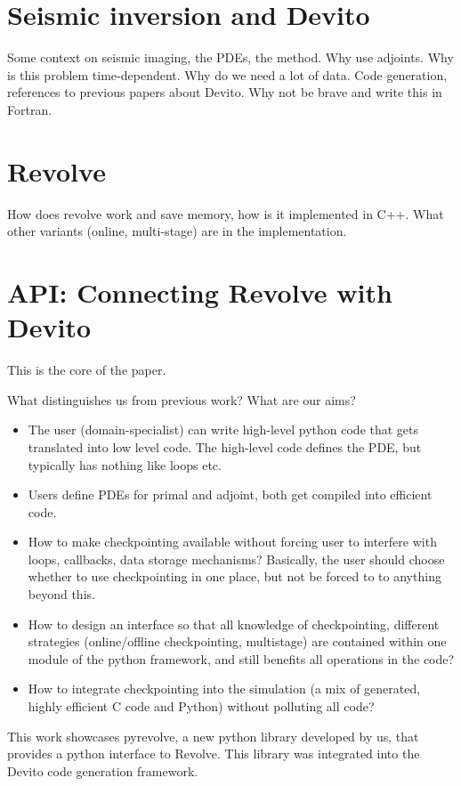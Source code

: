 \documentclass[sigconf]{acmart}
\begin{document}
\section{Seismic inversion and Devito}
\label{sec:inversion_devito}
Some context on seismic imaging, the PDEs, the method. Why use
adjoints. Why is this problem time-dependent. Why do we need a lot of
data.
Code generation, references to previous papers about Devito. Why not
be brave and write this in Fortran.

\section{Revolve}
\label{sec:revolve}
How does revolve work and save memory, how is it implemented in C++. What other variants (online,
multi-stage) are in the implementation.

\section{API: Connecting Revolve with Devito}
\label{sec:api}
This is the core of the paper.

What distinguishes us from previous work? What are our aims?
\begin{itemize}
\item The user (domain-specialist) can write high-level python code that gets translated into low
level code. The high-level code defines the PDE, but typically has nothing like loops etc.
\item Users define PDEs for primal and adjoint, both get compiled into efficient code.
\item How to make checkpointing available without forcing user to interfere with loops, callbacks,
data storage mechanisms? Basically, the user should choose whether to use checkpointing in one
place, but not be forced to to anything beyond this.
\item How to design an interface so that all knowledge of checkpointing, different strategies
(online/offline checkpointing, multistage) are contained within one module of the python framework,
and still benefits all operations in the code?
\item How to integrate checkpointing into the simulation (a mix of generated, highly efficient C
code and Python) without polluting all code?
\end{itemize}

This work showcases pyrevolve, a new python library developed by us, that provides a python
interface to Revolve. This library was integrated into the Devito code generation framework.
\end{document}
